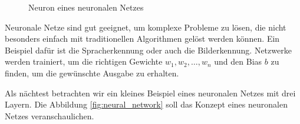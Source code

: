\documentclass[11pt,a4paper]{article}
\begin{document}
\begin{figure}[h]
	\centering

	\caption{Neuron eines neuronalen Netzes}
	\label{fig:neuron}

\end{figure}


\noindent
Neuronale Netze sind gut geeignet, um komplexe Probleme zu lösen, die nicht besonders einfach mit
traditionellen Algorithmen gelöst werden können. Ein Beispiel dafür ist die Spracherkennung oder
auch die Bilderkennung. Netzwerke werden trainiert, um die richtigen Gewichte
\(w_{1}, w_{2}, \dots, w_{n}\) und den Bias \(b\) zu finden, um die gewünschte Ausgabe zu erhalten.

\noindent \newline
Als nächtest betrachten wir ein kleines Beispiel eines neuronalen Netzes mit drei Layern.
Die Abbildung \ref{fig:neural_network} soll das Konzept eines neuronalen Netzes veranschaulichen.

\vspace{0.5cm}
\end{document}
